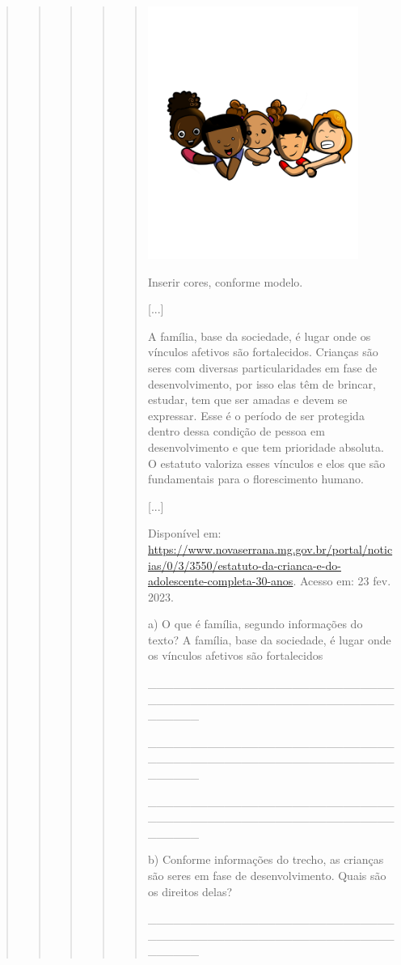 \begin{quote}
\begin{quote}
\begin{quote}
\begin{quote}
\begin{quote}
\includegraphics[width=2.70833in,height=3.25006in]{media/image27.png}

Inserir cores, conforme modelo.

{[}...{]}

A família, base da sociedade, é lugar onde os vínculos afetivos são
fortalecidos. Crianças são seres com diversas particularidades em fase
de desenvolvimento, por isso elas têm de brincar, estudar, tem que ser
amadas e devem se expressar. Esse é o período de ser protegida dentro
dessa condição de pessoa em desenvolvimento e que tem prioridade
absoluta. O estatuto valoriza esses vínculos e elos que são fundamentais
para o florescimento humano.

{[}...{]}

Disponível em:
\url{https://www.novaserrana.mg.gov.br/portal/noticias/0/3/3550/estatuto-da-crianca-e-do-adolescente-completa-30-anos}.
Acesso em: 23 fev. 2023.

a) O que é família, segundo informações do texto? A família, base da
sociedade, é lugar onde os vínculos afetivos são fortalecidos

\_\_\_\_\_\_\_\_\_\_\_\_\_\_\_\_\_\_\_\_\_\_\_\_\_\_\_\_\_\_\_\_\_\_\_\_\_\_\_\_\_\_\_\_\_\_\_\_\_\_\_\_\_\_\_\_\_\_\_\_\_\_\_\_

\_\_\_\_\_\_\_\_\_\_\_\_\_\_\_\_\_\_\_\_\_\_\_\_\_\_\_\_\_\_\_\_\_\_\_\_\_\_\_\_\_\_\_\_\_\_\_\_\_\_\_\_\_\_\_\_\_\_\_\_\_\_\_\_

\_\_\_\_\_\_\_\_\_\_\_\_\_\_\_\_\_\_\_\_\_\_\_\_\_\_\_\_\_\_\_\_\_\_\_\_\_\_\_\_\_\_\_\_\_\_\_\_\_\_\_\_\_\_\_\_\_\_\_\_\_\_\_\_

b) Conforme informações do trecho, as crianças são seres em fase de
desenvolvimento. Quais são os direitos delas?

\_\_\_\_\_\_\_\_\_\_\_\_\_\_\_\_\_\_\_\_\_\_\_\_\_\_\_\_\_\_\_\_\_\_\_\_\_\_\_\_\_\_\_\_\_\_\_\_\_\_\_\_\_\_\_\_\_\_\_\_\_\_\_\_


\end{quote}
\end{quote}
\end{quote}
\end{quote}
\end{quote}
